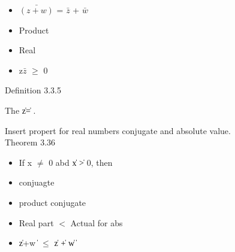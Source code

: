 	\begin{itemize}[leftmargin=2cm]
		\item $\bar{(z+w)}$ = $\bar{z}$ + $\bar{w}$

			\item Product

			\item Real

			\item z$\bar{z}$ $ \geq $ 0 
	\end{itemize}

	{ \color{blue} Definition 3.3.5 } 
	
	\qquad The \|z\| = .

	\qquad Insert propert for real numbers conjugate and absolute value. \\

{ \color{blue} Theorem 3.36  } 

\begin{itemize}[leftmargin=2cm]
	\item If x $\not =$ 0 abd \| x \| > 0, then 
	\item conjuagte
	\item product conjugate
	\item Real part $<$ Actual for abs
	\item \| z+w \| $ \leq $  \| z \| + \| w \|
\end{itemize}


